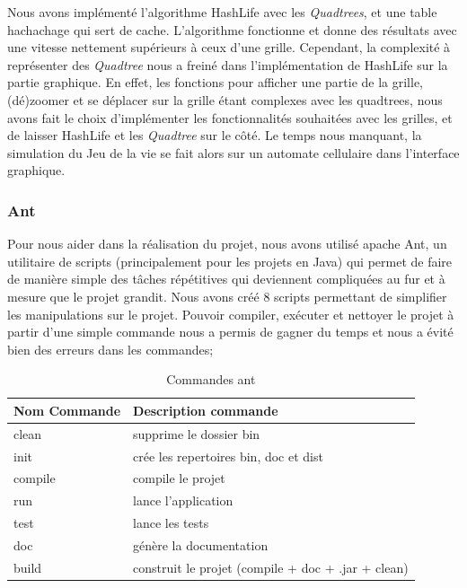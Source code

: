 \documentclass[12pt]{article}
\begin{document}
			Nous avons implémenté l'algorithme HashLife avec les \emph{Quadtrees}, et une table hachachage qui sert de cache. L'algorithme fonctionne et donne des résultats avec une vitesse 
			nettement supérieurs à ceux d'une grille. Cependant, la complexité à représenter des \emph{Quadtree} nous a freiné dans l'implémentation de HashLife sur la partie graphique. 
			En effet, les fonctions pour afficher une partie de la grille, (dé)zoomer et se déplacer sur la grille étant complexes avec les quadtrees, 
			nous avons fait le choix d'implémenter les fonctionnalités souhaitées avec les grilles, et de laisser HashLife et les \emph{Quadtree} sur le côté. 
			Le temps nous manquant, la simulation du Jeu de la vie se fait alors sur un automate cellulaire dans l'interface graphique.

			\subsubsection{Ant}
			Pour nous aider dans la réalisation du projet, nous avons utilisé apache Ant, un utilitaire de scripts (principalement pour les projets en Java) qui permet de faire de manière 
			simple des tâches répétitives qui deviennent compliquées au fur et à mesure que le projet grandit. Nous avons créé 8 scripts permettant de simplifier les manipulations sur le projet. 
			Pouvoir compiler, exécuter et nettoyer le projet à partir d'une simple commande nous a permis de gagner du temps et nous a évité bien des erreurs dans les commandes;
			\begin{table}[!htpb]
				\center
				\begin{tabular}{|l|l|}
					\hline
					\textbf{Nom Commande} & \textbf{Description commande} \\
					\hline
					clean & supprime le dossier bin \\
					\hline
					init & crée les repertoires bin, doc et dist \\
					\hline
					compile & compile le projet \\
					\hline
					run & lance l'application \\
					\hline
					test & lance les tests \\
					\hline
					doc & génère la documentation \\
					\hline
					build & construit le projet (compile + doc + .jar + clean) \\
					\hline
				\end{tabular}
				\caption{Commandes ant}
				\label{tab1}
			\end{table}
			
\end{document}
